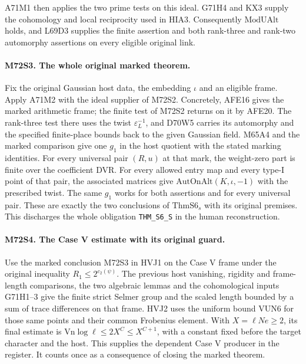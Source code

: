 A71M1 then applies the two prime tests on this ideal. G71H4 and
KX3 supply the cohomology and local reciprocity used in HIA3.
Consequently $\mathrm{ModUAlt}$ holds, and L69D3 supplies the
finite assertion and both rank-three and rank-two automorphy
assertions on every eligible original link.

\paragraph{M72S3. The whole original marked theorem.}
Fix the original Gaussian host data, the embedding $\iota$ and an
eligible frame. Apply A71M2 with the ideal supplier of M72S2.
Concretely, AFE16 gives the marked arithmetic frame; the finite
test of M72S2 returns on it by AFE20. The rank-three test there
uses the twist $\varepsilon_L^{-1}$, and D70W5 carries its
automorphy and the specified finite-place bounds back to the
given Gaussian field. M65A4 and the marked comparison give
one $g_1$ in the host quotient with the stated marking identities.
For every universal pair $(R,u)$ at that mark, the weight-zero
part is finite over the coefficient DVR. For every allowed entry
map and every type-I point of that pair, the associated matrices
give $\mathrm{AutOnAlt}(K,\iota,-1)$ with the prescribed twist.
The same $g_1$ works for both assertions and for every universal
pair. These are exactly the two conclusions of
$\mathrm{ThmS6}_s$ with its original premises. This discharges
the whole obligation \texttt{THM\_S6\_S} in the human reconstruction.

\paragraph{M72S4. The Case V estimate with its original guard.}
Use the marked conclusion M72S3 in HVJ1 on the Case V frame under
the original inequality $R_1\le2^{c_2(\psi)}$. The previous host
vanishing, rigidity and frame-length comparisons, the two algebraic
lemmas and the cohomological inputs G71H1--3 give the finite strict
Selmer group and the scaled length bounded by a sum of trace
differences on that frame. HVJ2 uses the uniform bound VUN6 for
those same points and their common Frobenius element. With
$X=\ell N e\ge2$, its final estimate is
$\mathrm{Vn}\log\ell\le 2X^C\le X^{C+1}$, with a constant
fixed before the target character and the host. This supplies the
dependent Case V producer in the register. It counts once as a
consequence of closing the marked theorem.
